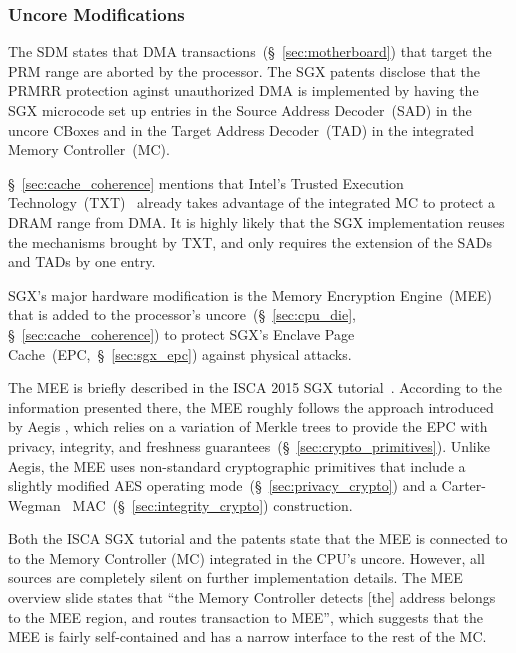 \subsubsection{Uncore Modifications}
\label{sec:sgx_uncore_modifications}

The SDM states that DMA transactions~(\S~\ref{sec:motherboard}) that target the
PRM range are aborted by the processor. The SGX patents disclose that the PRMRR
protection aginst unauthorized DMA is implemented by having the SGX microcode
set up entries in the Source Address Decoder~(SAD) in the uncore CBoxes and in
the Target Address Decoder~(TAD) in the integrated Memory Controller~(MC).

\S~\ref{sec:cache_coherence} mentions that Intel's Trusted Execution
Technology~(TXT)~\cite{grawrock2009txt} already takes advantage of the
integrated MC to protect a DRAM range from DMA. It is highly likely that the
SGX implementation reuses the mechanisms brought by TXT, and only requires the
extension of the SADs and TADs by one entry.

SGX's major hardware modification is the Memory Encryption Engine~(MEE) that is
added to the processor's uncore~(\S~\ref{sec:cpu_die},
\S~\ref{sec:cache_coherence}) to protect SGX's Enclave Page
Cache~(EPC,~\S~\ref{sec:sgx_epc}) against physical attacks.


The MEE is briefly described in the ISCA 2015 SGX
tutorial~\cite{intel2015iscasgx}. According to the information presented there,
the MEE roughly follows the approach introduced by Aegis \cite{suh2003aegis}
\cite{aegis_impl}, which relies on a variation of Merkle trees to provide the
EPC with privacy, integrity, and freshness
guarantees~(\S~\ref{sec:crypto_primitives}). Unlike Aegis, the MEE uses
non-standard cryptographic primitives that include a slightly modified AES
operating mode~(\S~\ref{sec:privacy_crypto}) and a
Carter-Wegman~\cite{carter1977mac, wegman1981mac}
MAC~(\S~\ref{sec:integrity_crypto}) construction.


Both the ISCA SGX tutorial and the patents state that the MEE is connected to
to the Memory Controller (MC) integrated in the CPU's uncore. However, all
sources are completely silent on further implementation details. The
MEE overview slide states that ``the Memory Controller detects [the] address
belongs to the MEE region, and routes transaction to MEE'', which suggests that
the MEE is fairly self-contained and has a narrow interface to the rest of the
MC.


